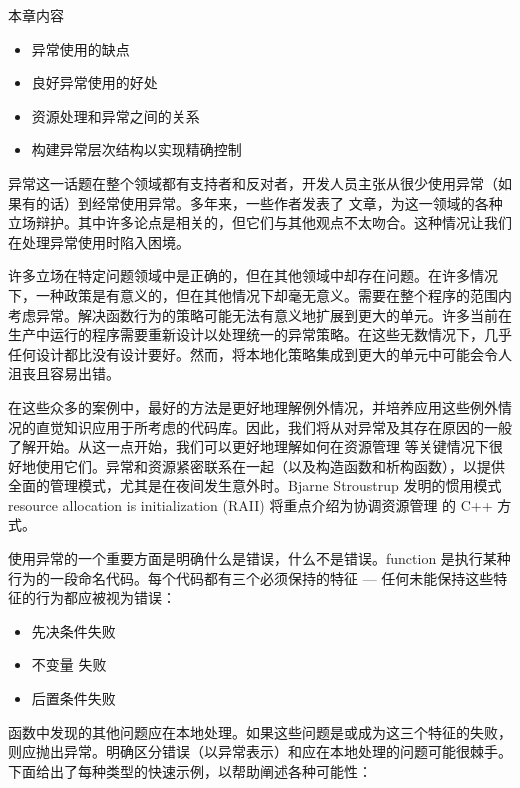 本章内容

\begin{itemize}
\item
异常使用的缺点

\item
良好异常使用的好处

\item
资源处理和异常之间的关系

\item
构建异常层次结构以实现精确控制
\end{itemize}

异常这一话题在整个领域都有支持者和反对者，开发人员主张从很少使用异常（如果有的话）到经常使用异常。多年来，一些作者发表了 文章，为这一领域的各种立场辩护。其中许多论点是相关的，但它们与其他观点不太吻合。这种情况让我们在处理异常使用时陷入困境。

许多立场在特定问题领域中是正确的，但在其他领域中却存在问题。在许多情况下，一种政策是有意义的，但在其他情况下却毫无意义。需要在整个程序的范围内考虑异常。解决函数行为的策略可能无法有意义地扩展到更大的单元。许多当前在生产中运行的程序需要重新设计以处理统一的异常策略。在这些无数情况下，几乎任何设计都比没有设计要好。然而，将本地化策略集成到更大的单元中可能会令人沮丧且容易出错。

在这些众多的案例中，最好的方法是更好地理解例外情况，并培养应用这些例外情况的直觉知识应用于所考虑的代码库。因此，我们将从对异常及其存在原因的一般了解开始。从这一点开始，我们可以更好地理解如何在资源管理 等关键情况下很好地使用它们。异常和资源紧密联系在一起（以及构造函数和析构函数），以提供全面的管理模式，尤其是在夜间发生意外时。Bjarne Stroustrup 发明的惯用模式resource allocation is initialization (RAII) 将重点介绍为协调资源管理 的 C++ 方式。

使用异常的一个重要方面是明确什么是错误，什么不是错误。function 是执行某种行为的一段命名代码。每个代码都有三个必须保持的特征 — 任何未能保持这些特征的行为都应被视为错误：

\begin{itemize}
\item
先决条件失败

\item
不变量 失败

\item
后置条件失败
\end{itemize}

函数中发现的其他问题应在本地处理。如果这些问题是或成为这三个特征的失败，则应抛出异常。明确区分错误（以异常表示）和应在本地处理的问题可能很棘手。下面给出了每种类型的快速示例，以帮助阐述各种可能性：

